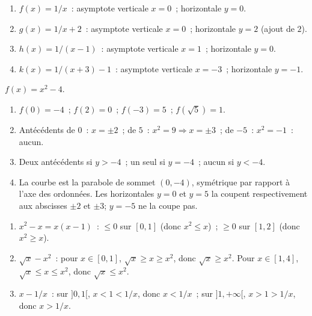 
\begin{enumerate}
  \item $f(x)=1/x$~: asymptote verticale $x=0$~; horizontale $y=0$.
  \item $g(x)=1/x+2$~: asymptote verticale $x=0$~; horizontale $y=2$ (ajout de $2$).
  \item $h(x)=1/(x-1)$~: asymptote verticale $x=1$~; horizontale $y=0$.
  \item $k(x)=1/(x+3)-1$~: asymptote verticale $x=-3$~; horizontale $y=-1$.
\end{enumerate}


$f(x)=x^2-4$.
\begin{enumerate}
  \item $f(0)=-4$~; $f(2)=0$~; $f(-3)=5$~; $f(\sqrt{5})=1$.
  \item Ant\'ec\'edents de $0$~: $x=\pm2$~;
        de $5$~: $x^2=9\Rightarrow x=\pm3$~;
        de $-5$~: $x^2=-1$~: aucun.
  \item Deux ant\'ec\'edents si $y>-4$~; un seul si $y=-4$~; aucun si $y<-4$.
  \item La courbe est la parabole de sommet $(0,-4)$, sym\'etrique par rapport
        \`a l'axe des ordonn\'ees. Les horizontales $y=0$ et $y=5$
        la coupent respectivement aux abscisses $\pm2$ et $\pm3$;
        $y=-5$ ne la coupe pas.
        \begin{center}
        \end{center}
\end{enumerate}


\begin{enumerate}
  \item $x^2-x=x(x-1)$~: $\leq0$ sur $[0,1]$ (donc $x^2\leq x$)~;
        $\geq0$ sur $[1,2]$ (donc $x^2\geq x$).
  \item $\sqrt{x}-x^2$~: pour $x\in[0,1]$, $\sqrt{x}\geq x\geq x^2$, donc $\sqrt{x}\geq x^2$.\checkmark
        Pour $x\in[1,4]$, $\sqrt{x}\leq x\leq x^2$, donc $\sqrt{x}\leq x^2$.\checkmark
  \item $x-1/x$~: sur $]0,1[$, $x<1<1/x$, donc $x<1/x$~;
        sur $]1,+\infty[$, $x>1>1/x$, donc $x>1/x$.
\end{enumerate}

